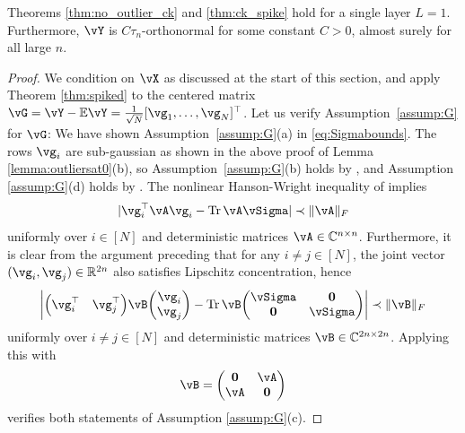 \begin{lemma}\label{lemma:onelayer}
Theorems \ref{thm:no_outlier_ck} and
\ref{thm:ck_spike} hold for a single layer $L=1$.
Furthermore, $\vY$ is $C\tau_n$-orthonormal for some constant $C>0$, 
almost surely for all large $n$.
\end{lemma}
\begin{proof}
We condition on $\vX$ as discussed at the start of this section, and
apply Theorem \ref{thm:spiked} to the centered matrix
$\vG=\vY-\E\vY=\frac{1}{\sqrt{N}}[\vg_1,\ldots,\vg_N]^\top$.
Let us verify Assumption~\ref{assump:G} for $\vG$:
We have shown Assumption~\ref{assump:G}(a) in \eqref{eq:Sigmabounds}.
The rows $\vg_i$ are sub-gaussian as shown in the above proof of
Lemma \ref{lemma:outliersat0}(b), so Assumption~\ref{assump:G}(b) holds by
\cite[Eq.\ (5.26)]{vershynin2010introduction}, and
Assumption \ref{assump:G}(d) holds by \cite[Lemma 2]{jin2019short}.
The nonlinear Hanson-Wright inequality of
\cite[Eq.\ (3.3)]{wang2021deformed} implies
\[|\vg_i^\top\vA\vg_i-\Tr\vA\vSigma| \prec \|\vA\|_F\]
uniformly over $i \in [N]$ and deterministic matrices
$\vA \in \C^{n \times n}$. Furthermore, it is clear from the argument preceding
\cite[Eq.\ (3.3)]{wang2021deformed} that for any $i \neq j \in [N]$, the joint
vector $(\vg_i,\vg_j) \in \R^{2n}$ also satisfies Lipschitz concentration, hence
		\[\left|\begin{pmatrix}
			\vg_i^\top & \vg_j^\top
		\end{pmatrix} \vB
		\begin{pmatrix}
			\vg_i\\
			\vg_j
		\end{pmatrix}
-\Tr \vB\begin{pmatrix} \vSigma & \mathbf{0} \\
\mathbf{0} & \vSigma \end{pmatrix} \right| \prec \|\vB\|_F\]
uniformly over $i \neq j \in [N]$ and deterministic matrices $\vB \in \C^{2n
\times 2n}$. Applying this with
\[\vB=\begin{pmatrix} \mathbf{0} &\vA\\ \vA &\mathbf{0} \end{pmatrix}\]
verifies both statements of Assumption \ref{assump:G}(c).


\end{proof}
